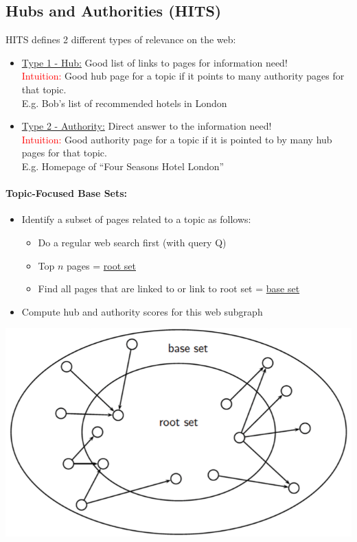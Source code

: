 \documentclass[a4paper,11pt]{article}
\begin{document}
\begin{multicols}{2}
\subsection{Hubs and Authorities (HITS)}
HITS defines 2 different types of relevance on the web:
\begin{itemize}
  \item \underline{Type 1 - Hub:} Good list of links to pages for information need!\\
        \textcolor{red}{Intuition:} Good hub page for a topic if it points to many authority pages for that topic.\\
        E.g. Bob's list of recommended hotels in London\\
  \item \underline{Type 2 - Authority:} Direct answer to the information need!\\
        \textcolor{red}{Intuition:} Good authority page for a topic if it is pointed to by many hub pages for that topic.\\
        E.g. Homepage of ``Four Seasons Hotel London''
\end{itemize}

\columnbreak

\paragraph{Topic-Focused Base Sets:}
\begin{itemize}
  \item Identify a subset of pages related to a topic as follows:
  \begin{itemize}
    \item Do a regular web search first (with query Q)
    \item Top $n$ pages = \underline{root set}
    \item Find all pages that are linked to or link to root set = \underline{base set}
  \end{itemize}
  \item Compute hub and authority scores for this web subgraph
\end{itemize}
\begin{center}
  \includegraphics[width=0.5\columnwidth]{hits.png}
\end{center}


\end{multicols}
\end{document}

